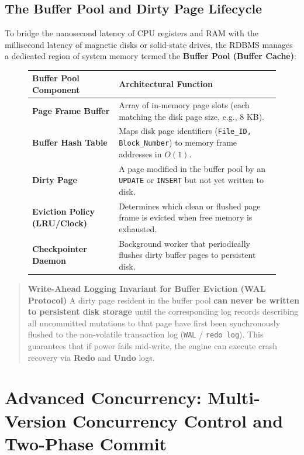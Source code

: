 \subsection{The Buffer Pool and Dirty Page Lifecycle}
To bridge the nanosecond latency of CPU registers and RAM with the millisecond latency of magnetic disks or solid-state drives, the RDBMS manages a dedicated region of system memory termed the \textbf{Buffer Pool (Buffer Cache)}:
\begin{figure}[htbp]
\centering
\small
\begin{tabularx}{\textwidth}{p{3.2cm} X}
\toprule
\textbf{Buffer Pool Component} & \textbf{Architectural Function} \\
\midrule
\textbf{Page Frame Buffer} & Array of in-memory page slots (each matching the disk page size, e.g., 8 KB). \\
\textbf{Buffer Hash Table} & Maps disk page identifiers (\texttt{File\_ID, Block\_Number}) to memory frame addresses in $O(1)$. \\
\textbf{Dirty Page} & A page modified in the buffer pool by an \texttt{UPDATE} or \texttt{INSERT} but not yet written to disk. \\
\textbf{Eviction Policy (LRU/Clock)} & Determines which clean or flushed page frame is evicted when free memory is exhausted. \\
\textbf{Checkpointer Daemon} & Background worker that periodically flushes dirty buffer pages to persistent disk. \\
\bottomrule
\end{tabularx}
\end{figure}

\begin{quote}
\textbf{Write-Ahead Logging Invariant for Buffer Eviction (WAL Protocol)}
A dirty page resident in the buffer pool \textbf{can never be written to persistent disk storage} until the corresponding log records describing all uncommitted mutations to that page have first been synchronously flushed to the non-volatile transaction log (\texttt{WAL} / \texttt{redo log}). This guarantees that if power fails mid-write, the engine can execute crash recovery via \textbf{Redo} and \textbf{Undo} logs.
\end{quote}

\section{Advanced Concurrency: Multi-Version Concurrency Control and Two-Phase Commit}
\label{sec:dbms_mvcc_2pc}

